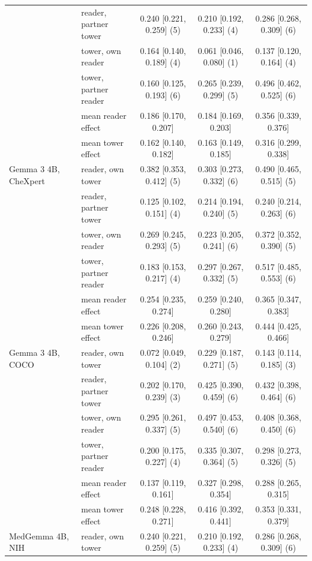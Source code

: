\documentclass{article}
\begin{document}
\begin{table}[htbp]
{\begin{tabular}{llccc}
 & reader, partner tower & 0.240 [0.221, 0.259] (5) & 0.210 [0.192, 0.233] (4) & 0.286 [0.268, 0.309] (6) \\
 & tower, own reader & 0.164 [0.140, 0.189] (4) & 0.061 [0.046, 0.080] (1) & 0.137 [0.120, 0.164] (4) \\
 & tower, partner reader & 0.160 [0.125, 0.193] (6) & 0.265 [0.239, 0.299] (5) & 0.496 [0.462, 0.525] (6) \\
 & \quad mean reader effect & 0.186 [0.170, 0.207] & 0.184 [0.169, 0.203] & 0.356 [0.339, 0.376] \\
 & \quad mean tower effect & 0.162 [0.140, 0.182] & 0.163 [0.149, 0.185] & 0.316 [0.299, 0.338] \\
\addlinespace
Gemma 3 4B, CheXpert & reader, own tower & 0.382 [0.353, 0.412] (5) & 0.303 [0.273, 0.332] (6) & 0.490 [0.465, 0.515] (5) \\
 & reader, partner tower & 0.125 [0.102, 0.151] (4) & 0.214 [0.194, 0.240] (5) & 0.240 [0.214, 0.263] (6) \\
 & tower, own reader & 0.269 [0.245, 0.293] (5) & 0.223 [0.205, 0.241] (6) & 0.372 [0.352, 0.390] (5) \\
 & tower, partner reader & 0.183 [0.153, 0.217] (4) & 0.297 [0.267, 0.332] (5) & 0.517 [0.485, 0.553] (6) \\
 & \quad mean reader effect & 0.254 [0.235, 0.274] & 0.259 [0.240, 0.280] & 0.365 [0.347, 0.383] \\
 & \quad mean tower effect & 0.226 [0.208, 0.246] & 0.260 [0.243, 0.279] & 0.444 [0.425, 0.466] \\
\addlinespace
Gemma 3 4B, COCO & reader, own tower & 0.072 [0.049, 0.104] (2) & 0.229 [0.187, 0.271] (5) & 0.143 [0.114, 0.185] (3) \\
 & reader, partner tower & 0.202 [0.170, 0.239] (3) & 0.425 [0.390, 0.459] (6) & 0.432 [0.398, 0.464] (6) \\
 & tower, own reader & 0.295 [0.261, 0.337] (5) & 0.497 [0.453, 0.540] (6) & 0.408 [0.368, 0.450] (6) \\
 & tower, partner reader & 0.200 [0.175, 0.227] (4) & 0.335 [0.307, 0.364] (5) & 0.298 [0.273, 0.326] (5) \\
 & \quad mean reader effect & 0.137 [0.119, 0.161] & 0.327 [0.298, 0.354] & 0.288 [0.265, 0.315] \\
 & \quad mean tower effect & 0.248 [0.228, 0.271] & 0.416 [0.392, 0.441] & 0.353 [0.331, 0.379] \\
\addlinespace
MedGemma 4B, NIH & reader, own tower & 0.240 [0.221, 0.259] (5) & 0.210 [0.192, 0.233] (4) & 0.286 [0.268, 0.309] (6) \\

\end{tabular}}
\end{table}
\end{document}
